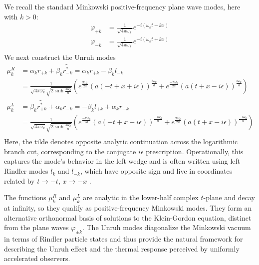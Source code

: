 \documentclass[12pt,a4paper]{article}
\begin{document}
We recall the standard Minkowski positive-frequency plane wave modes, here with $k>0$:
\begin{equation}
  \begin{aligned}
    \varphi_{+k} &= \frac{1}{\sqrt{4 \pi \omega_k}} e^{-i(\omega_k t - k x)}\\
    \varphi_{-k} &= \frac{1}{\sqrt{4 \pi \omega_k}} e^{-i(\omega_k t + k x)}\\
  \end{aligned}
\end{equation}
We next construct the Unruh modes
\begin{equation}
  \begin{aligned}
    \mu^R_k &= \alpha_k r_{+k} + \beta_k \widetilde{r_{-k}^*} = \alpha_k r_{+k} - \beta_k l_{-k} \\
    &= \frac{1}{\sqrt{4 \pi \omega_k}\sqrt{2 \sinh \frac{\pi \omega_k}{a}}} \left( e^{\frac{\pi \omega_k}{2a}} \left(a(-t+x+i\epsilon)\right)^{\frac{i\omega_k}{a}} + e^{\frac{-\pi \omega_k}{2a}} \left(a(t+x-i\epsilon)\right)^{\frac{i\omega_k}{a}} \right) \\
    \mu^L_k &= \beta_k \widetilde{r_{+k}^*} + \alpha_k r_{-k}  = -\beta_k l_{+k} + \alpha_k r_{-k} \\
    &=\frac{1}{\sqrt{4 \pi \omega_k}\sqrt{2 \sinh \frac{\pi \omega_k}{a}}} \left( e^{\frac{-\pi \omega_k}{2a}} \left(a(-t+x+i\epsilon)\right)^{\frac{-i\omega_k}{a}} + e^{\frac{\pi \omega_k}{2a}} \left(a(t+x-i\epsilon)\right)^{\frac{-i\omega_k}{a}} \right) \\
  \end{aligned}
  \label{unruh_mode_def}
\end{equation}
Here, the tilde denotes opposite analytic continuation across the logarithmic branch cut, corresponding to the conjugate $i \epsilon$ prescription. Operationally, this captures the mode's behavior in the left wedge and is often written using left Rindler modes $l_k$ and $l_{-k}$, which have opposite sign and live in coordinates related by $t \to -t$, $x \to -x$ .

The functions $\mu^R_k$ and $\mu^L_k$ are analytic in the lower-half complex $t$-plane and decay at infinity, so they qualify as positive-frequency Minkowski modes. They form an alternative orthonormal basis of solutions to the Klein-Gordon equation, distinct from the plane waves $\varphi_{\pm k}$. The Unruh modes diagonalize the Minkowski vacuum in terms of Rindler particle states and thus provide the natural framework for describing the Unruh effect and the thermal response perceived by uniformly accelerated observers.
\end{document}
